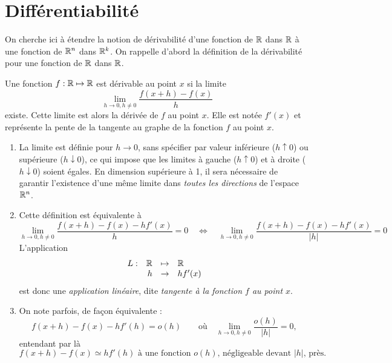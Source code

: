 \section{Différentiabilité} \label{sec:Multivar-Diff}


On cherche ici à étendre la notion de dérivabilité d'une fonction de $\mathbb{R}$ dans $\mathbb{R}$ à une fonction de $\mathbb{R}^n$ dans $\mathbb{R}^k$. On rappelle d'abord la définition de la dérivabilité pour une fonction de $\mathbb{R}$ dans $\mathbb{R}$.

\begin{definition}[Dérivabilité] \label{def:derivabilite}
  Une fonction $f: \mathbb{R} \mapsto \mathbb{R}$ est dérivable au point $x$ si la limite
  $$
  \lim_{h \to 0, h \neq 0} \frac{f(x+h) - f(x)}{h}
  $$
  existe. Cette limite est alors la dérivée de $f$ au point $x$. Elle est notée $f'(x)$ et représente la pente de la tangente au graphe de la fonction $f$ au point $x$.
\end{definition}

\remarks
\begin{enumerate}
  \item La limite est définie pour $h \to 0$, sans spécifier par valeur inférieure ($h \uparrow 0$) ou supérieure ($h \downarrow 0$), ce qui impose que les limites à gauche ($h \uparrow 0$) et à droite ($h \downarrow 0$) soient égales. En dimension supérieure à 1, il sera nécessaire de garantir l'existence d'une même limite dans {\em toutes les directions} de l'espace $\mathbb{R}^n$.
  \item Cette définition est équivalente à
  $$
  \lim_{h\to 0, h \neq 0} \frac{f(x+h) - f(x) - hf'(x)}{h} = 0
  \quad \Leftrightarrow \quad 
  \lim_{h\to 0, h \neq 0} \frac{f(x+h) - f(x) - hf'(x)}{|h|} = 0
  $$
  L'application 
  $$
  \begin{array}{rrcl}
    L :  & \mathbb{R} & \mapsto & \mathbb{R} \\
    & h & \to &  hf'(x)
  \end{array}
  $$
  est donc une {\em application linéaire}, dite {\em tangente à la fonction $f$ au point $x$}.
  \item On note parfois, de façon équivalente :
  $$
  f(x+h) - f(x) - h f'(h) = o(h)
  \qquad \text{où} \quad
  \lim_{h\to 0, h \neq 0} \frac{o(h)}{|h|} = 0,
  $$
  entendant par là 
  $$
  \text{$f(x+h) - f(x) \simeq h f'(h)$ à une fonction $o(h)$, négligeable devant $|h|$, près.}
  $$
\end{enumerate}

